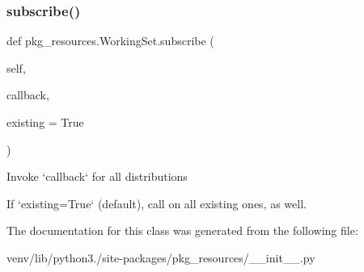 \subsubsection{\texorpdfstring{subscribe()}{subscribe()}}
{\footnotesize\ttfamily def pkg\+\_\+resources.\+Working\+Set.\+subscribe (\begin{DoxyParamCaption}\item[{}]{self,  }\item[{}]{callback,  }\item[{}]{existing = {\ttfamily True} }\end{DoxyParamCaption})}

\begin{DoxyVerb}Invoke `callback` for all distributions

If `existing=True` (default),
call on all existing ones, as well.
\end{DoxyVerb}
 

The documentation for this class was generated from the following file\+:\begin{DoxyCompactItemize}
\item 
venv/lib/python3./site-\/packages/pkg\+\_\+resources/\+\_\+\+\_\+init\+\_\+\+\_\+.\+py\end{DoxyCompactItemize}
